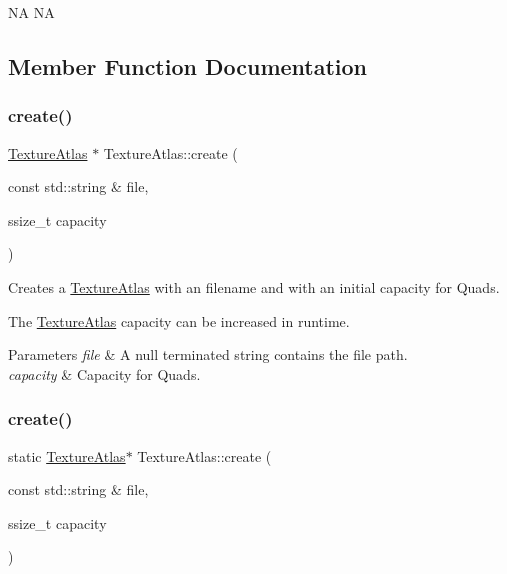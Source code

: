 NA  NA 

\subsection{Member Function Documentation}
\mbox{\label{classTextureAtlas_a6e44c9ac5bfa5c9216facea7d11cbb64}} 
\subsubsection{\texorpdfstring{create()}{create()}\hspace{0.1cm}{\footnotesize\ttfamily [1/2]}}
{\footnotesize\ttfamily \hyperlink{classTextureAtlas}{Texture\+Atlas} $\ast$ Texture\+Atlas\+::create (\begin{DoxyParamCaption}\item[{const std\+::string \&}]{file,  }\item[{ssize\+\_\+t}]{capacity }\end{DoxyParamCaption})\hspace{0.3cm}{\ttfamily [static]}}

Creates a \hyperlink{classTextureAtlas}{Texture\+Atlas} with an filename and with an initial capacity for Quads.

The \hyperlink{classTextureAtlas}{Texture\+Atlas} capacity can be increased in runtime. 
\begin{DoxyParams}{Parameters}
{\em file} & A null terminated string contains the file path. \\
\hline
{\em capacity} & Capacity for Quads. \\
\hline
\end{DoxyParams}
\mbox{\label{classTextureAtlas_a5be100c58863b5e6d3c364661feaa5dd}} 
\subsubsection{\texorpdfstring{create()}{create()}\hspace{0.1cm}{\footnotesize\ttfamily [2/2]}}
{\footnotesize\ttfamily static \hyperlink{classTextureAtlas}{Texture\+Atlas}$\ast$ Texture\+Atlas\+::create (\begin{DoxyParamCaption}\item[{const std\+::string \&}]{file,  }\item[{ssize\+\_\+t}]{capacity }\end{DoxyParamCaption})\hspace{0.3cm}{\ttfamily [static]}}

